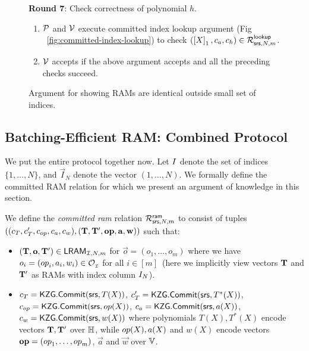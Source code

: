 \begin{figure}[htbp]
\begin{mdframed}
        {\bf Round 7}: Check correctness of polynomial $h$.
        \begin{enumerate}[leftmargin=1em, label=\arabic*.]
        \item $\mathcal{P}$ and $\mathcal{V}$ execute committed index lookup argument (Fig ~\ref{fig:committed-index-lookup})
        to check $(\left[{X}\right]_1,c_a,c_h)\in \mathcal{R}^{\mathsf{lookup}}_{\mathsf{srs},N,m}$.
        \item $\mathcal{V}$ accepts if the above argument accepts and all the preceding checks succeed.
        \end{enumerate}
    \end{mdframed}
    \caption{Argument for showing RAMs are identical outside small set of indices.}
    \label{fig:a-identical}
\end{figure}

\subsection{Batching-Efficient RAM: Combined Protocol}\label{subsec:all-together}
We put the entire protocol together now. Let $I$ denote the set of indices $\{1,\ldots,N\}$, and $\vec{I}_N$
denote the vector $(1,\ldots,N)$. We formally define the committed RAM relation for which we present an argument of
knowledge in this section.
\begin{definition}\label{defn:committed-ram}
We define the {\em committed ram} relation
$\mathcal{R}^{\mathsf{ram}}_{\mathsf{srs},N,m}$ to consist of tuples $((c_T, c_T', c_{op}, c_a, c_w),(\mathbf{T}, \mathbf{T}',\mathbf{{op}},\mathbf{a},\mathbf{w}))$
such that:
\begin{itemize}[leftmargin=1em]
    \item $(\mathbf{T},\mathbf{o},\mathbf{T}')\in \mathsf{LRAM}_{\mathcal{I},N,m}$ for $\vec{o}=(o_1,\ldots,o_m)$ where we have $o_i=({op}_i, a_i, w_i)\in \mathcal{O}_{{}_\mathcal{I}}$ for all $i\in [m]$~(here we implicitly view vectors $\mathbf{T}$ and $\mathbf{T}'$ as RAMs with index column $I_N$). 
    
   
    \item $c_T=\mathsf{KZG.Commit}(\mathsf{srs}, T(X))$, $c_T'=\mathsf{KZG.Commit}(\mathsf{srs}, T^*(X))$, $c_{op} = \mathsf{KZG.Commit}(\mathsf{srs},{op}(X))$,  $c_a=\mathsf{KZG.Commit}(\mathsf{srs}, a(X))$,
    $c_w = \mathsf{KZG.Commit}(\mathsf{srs}, w(X))$ where polynomials $T(X), T^*(X)$ encode vectors $\mathbf{T}, \mathbf{T}'$ over $\mathbb{H}$, while ${op}(X), a(X)$ and
    $w(X)$ encode vectors $\mathbf{{op}}=({op}_1,\ldots,{op}_m)$, $\vec{a}$ and $\vec{w}$ over $\mathbb{V}$.
\end{itemize}
\end{definition}
